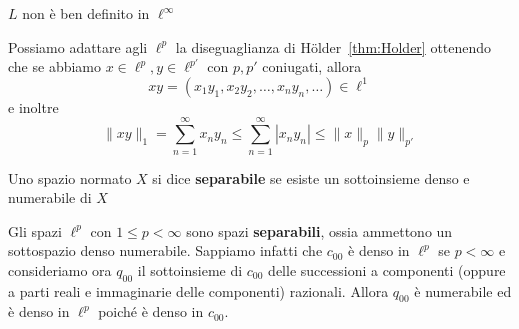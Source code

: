 \begin{remark}
    \(L\) non è ben definito in \(\ell^{\infty}\) 
\end{remark}

Possiamo adattare agli \(\ell^{p}\) la diseguaglianza di Hölder~\ref{thm:Holder}
ottenendo che se abbiamo \(x \in \ell^{p}, y \in \ell^{p'}\) con \(p, p'\)
coniugati, allora
\[
  xy = {(x_{1}y_{1}, x_{2}y_{2}, \dots, x_{n}y_{n}, \dots)} \in \ell^{1} 
\]
e inoltre
\[
  \|xy\|_1 = \sum_{n=1}^{\infty} x_{n}y_{n} \le \sum_{n=1}^{\infty} |x_{n}y_{n}| \le
  \|x\|_p \|y\|_{p'} 
\]
\begin{definition}\label{def:separabile}
    Uno spazio normato \(X\) si dice \textbf{separabile} se esiste un sottoinsieme
    denso e numerabile di \(X\)
\end{definition}

Gli spazi \(\ell^{p}\) con \(1 \le p < \infty\) sono spazi \textbf{separabili},
ossia ammettono un sottospazio denso numerabile. Sappiamo infatti che \(c_{00}
\) è denso in \(\ell^{p}\) se \(p < \infty\) e consideriamo ora \(q_{00} \) il
sottoinsieme di \(c_{00}\) delle successioni a componenti (oppure a parti reali
e immaginarie delle componenti) razionali. Allora \(q_{00} \) è numerabile ed è
denso in \(\ell^{p}\) poiché è denso in \(c_{00}\).

